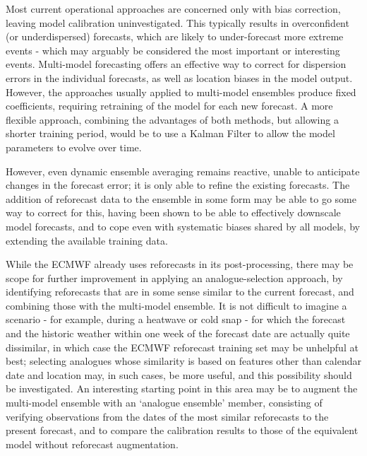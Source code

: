 \documentclass[10pt,fleqn]{article}
\begin{document}
Most current operational approaches are concerned only with bias correction, leaving model calibration uninvestigated. This typically results in overconfident (or underdispersed) forecasts, which are likely to under-forecast more extreme events - which may arguably be considered the most important or interesting events. Multi-model forecasting offers an effective way to correct for dispersion errors in the individual forecasts, as well as location biases in the model output. However, the approaches usually applied to multi-model ensembles produce fixed coefficients, requiring retraining of the model for each new forecast. A more flexible approach, combining the advantages of both methods, but allowing a shorter training period, would be to use a Kalman Filter to allow the model parameters to evolve over time.

However, even dynamic ensemble averaging remains reactive, unable to anticipate changes in the forecast error; it is only able to refine the existing forecasts. The addition of reforecast data to the ensemble in some form may be able to go some way to correct for this, having been shown to be able to effectively downscale model forecasts, and to cope even with systematic biases shared by all models, by extending the available training data. 

While the ECMWF already uses reforecasts in its post-processing, there may be scope for further improvement in applying an analogue-selection approach, by identifying reforecasts that are in some sense similar to the current forecast, and combining those with the multi-model ensemble. It is not difficult to imagine a scenario - for example, during a heatwave or cold snap - for which the forecast and the historic weather within one week of the forecast date are actually quite dissimilar, in which case the ECMWF reforecast training set may be unhelpful at best; selecting analogues whose similarity is based on features other than calendar date and location may, in such cases, be more useful, and this possibility should be investigated. An interesting starting point in this area may be to augment the multi-model ensemble with an `analogue ensemble' member, consisting of verifying observations from the dates of the most similar reforecasts to the present forecast, and to compare the calibration results to those of the equivalent model without reforecast augmentation.





\newpage
\printbibliography
\end{document}
